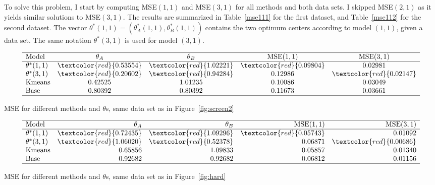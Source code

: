 \documentclass[oneside,10pt]{book}
\renewcommand{\arraystretch}{1.4} %
\begin{document}
To solve this problem, I start by computing MSE$(1,1)$ and MSE$(3,1)$ for all methods and both data sets. 
I skipped MSE$(2,1)$ as it yields similar solutions to MSE$(3,1)$. The results are summarized in 
Table~\ref{mse111} for the first dataset, and Table~\ref{mse112} for the second dataset. The vector   
$\theta^*(1, 1)=(\theta_A^*(1, 1),\theta_B^*(1, 1))$ contains the two optimum centers according to model $(1,1)$, given a data set. The same notation  
$\theta^*(3, 1)$ 
is used for model $(3,1)$.

\renewcommand{\arraystretch}{1.2} %
\begin{table}[H]
\[
\begin{array}{lcccc}
\hline
  \text{Model} &  \theta_A  & \theta_B & \text{MSE}(1,1) & \text{MSE}(3,1)  \\
\hline
\theta^*(1,1)	&	\textcolor{red}{0.53554}&	\textcolor{red}{1.02221}&	\textcolor{red}{0.09804}&	0.02981\\
\theta^*(3,1)	&	\textcolor{red}{0.20602}&	\textcolor{red}{0.94284}&	0.12986&	\textcolor{red}{0.02147}\\
\text{Kmeans}	&	0.42525&	1.01235&	0.10086&	0.03049\\
\text{Base}	&	0.80392&	0.80392&	0.11673&	0.03661\\
\hline
\end{array}
\]
\caption{\label{mse111} MSE for different methods and $\theta$s, same data set as in Figure~\ref{fig:screen2}}
\end{table}
\renewcommand{\arraystretch}{1.0} %
\renewcommand{\arraystretch}{1.2} %



\begin{table}[H]
\[
\begin{array}{lrrrr}
\hline
 \text{Model} &  \theta_A  & \theta_B & \text{MSE}(1,1) & \text{MSE}(3,1)  \\
\hline
\theta^*(1,1)	&	\textcolor{red}{0.72435} & \textcolor{red}{1.09296} & \textcolor{red}{0.05743} & 0.01092\\
\theta^*(3,1)	&	\textcolor{red}{1.06020} & \textcolor{red}{0.52378} & 0.06871 & \textcolor{red}{0.00686}\\
\text{Kmeans}	&	0.65856 & 1.09833 & 0.05857 & 0.01340\\
\text{Base}	&	0.92682 & 0.92682 & 0.06812 & 0.01156\\
\hline
\end{array}
\]
\caption{\label{mse112} MSE for different methods and $\theta$s, same data set as in Figure~\ref{fig:hard}}
\end{table}
\renewcommand{\arraystretch}{1.0} %
\end{document}
